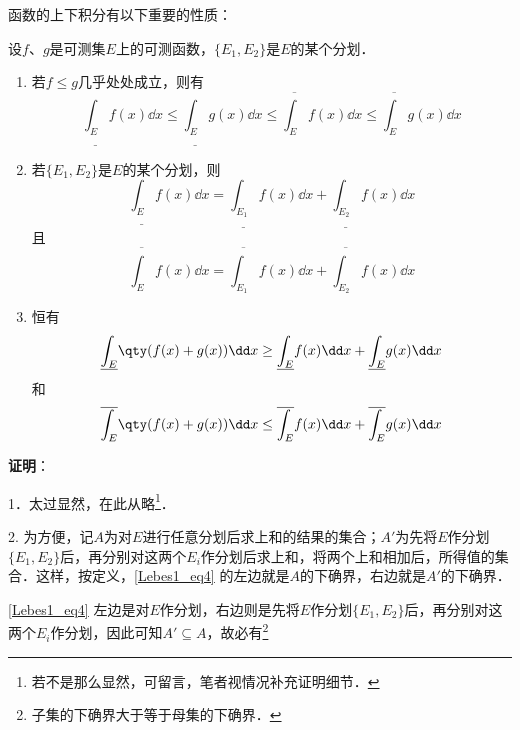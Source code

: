 函数的上下积分有以下重要的性质：

\begin{theorem}{}\label{Lebes1_the1}

设$f$、$g$是可测集$E$上的可测函数，$\{E_1, E_2\}$是$E$的某个分划．

\begin{enumerate}
  \item 若$f\leq g$几乎处处成立，则有
  \begin{equation}
  \underline{\int_E} f(x) \dd x \leq \underline{\int_E} g(x) \dd x \leq \overline{\int_E} f(x) \dd x \leq \overline{\int_E} g(x) \dd x
  \end{equation}
  \item 若$\{E_1, E_2\}$是$E$的某个分划，则
  \begin{equation}\label{Lebes1_eq1}
  \underline{\int_E} f(x) \dd x=\underline{\int_{E_1}} f(x) \dd x+\underline{\int_{E_2}} f(x) \dd x
  \end{equation}
  且
  \begin{equation}\label{Lebes1_eq4}
  \overline{\int_E} f(x) \dd x=\overline{\int_{E_1}} f(x) \dd x+\overline{\int_{E_2}} f(x) \dd x
  \end{equation}
  \item 恒有
  \begin{equation}\label{Lebes1_eq5}
  \underline{\int_E} \qty(f(x)+g(x)) \dd x \geq \underline{\int_E} f(x) \dd x+\underline{\int_E} g(x) \dd x
  \end{equation}
  和
  \begin{equation}\label{Lebes1_eq6}
  \overline{\int_E} \qty(f(x)+g(x)) \dd x \leq \overline{\int_E} f(x) \dd x+\overline{\int_E} g(x) \dd x
  \end{equation}
\end{enumerate}



\end{theorem}

\textbf{证明}：

1．太过显然，在此从略\footnote{若不是那么显然，可留言，笔者视情况补充证明细节．}．

2. 为方便，记$A$为对$E$进行任意分划后求上和的结果的集合；$A'$为先将$E$作分划$\{E_1, E_2\}$后，再分别对这两个$E_i$作分划后求上和，将两个上和相加后，所得值的集合．这样，按定义，\autoref{Lebes1_eq4} 的左边就是$A$的下确界，右边就是$A'$的下确界．

\autoref{Lebes1_eq4} 左边是对$E$作分划，右边则是先将$E$作分划$\{E_1, E_2\}$后，再分别对这两个$E_i$作分划，因此可知$A'\subseteq A$，故必有\footnote{子集的下确界大于等于母集的下确界．}

